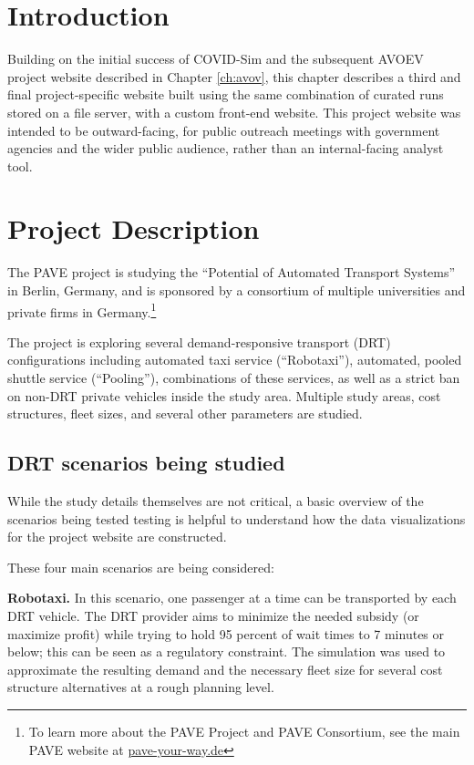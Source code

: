 \section{Introduction}
\label{pave-intro}

Building on the initial success of COVID-Sim and the subsequent AVOEV project website described in Chapter \ref{ch:avov}, this chapter describes a third and final project-specific website built using the same combination of curated runs stored on a file server, with a custom front-end website. This project website was intended to be outward-facing, for public outreach meetings with government agencies and the wider public audience, rather than an internal-facing analyst tool.

\section{Project Description}
\label{pave-project-description}

The \gls{PAVE} project is studying the ``Potential of Automated Transport Systems'' in Berlin, Germany, and is sponsored by a consortium of multiple universities and private firms in Germany.\footnote{To learn more about the PAVE Project and PAVE Consortium, see the main PAVE website at \href{https://pave-your-way.de}{pave-your-way.de}}

The project is exploring several demand-responsive transport (\gls{DRT}) configurations including automated taxi service (``Robotaxi''), automated, pooled shuttle service (``Pooling''), combinations of these services, as well as a strict ban on non-DRT private vehicles inside the study area. Multiple study areas, cost structures, fleet sizes, and several other parameters are studied.

\subsection{DRT scenarios being studied}
\label{pave-scenarios}

While the study details themselves are not critical, a basic overview of the scenarios being tested testing is helpful to understand how the data visualizations for the project website are constructed.

These four main scenarios are being considered:

\textbf{Robotaxi.} In this scenario, one passenger at a time can be transported by each DRT vehicle. The DRT provider aims to minimize the needed subsidy (or maximize profit) while trying to hold 95 percent of wait times to 7 minutes or below; this can be seen as a regulatory constraint. The simulation was used to approximate the resulting demand and the necessary fleet size for several cost structure alternatives at a rough planning level.


